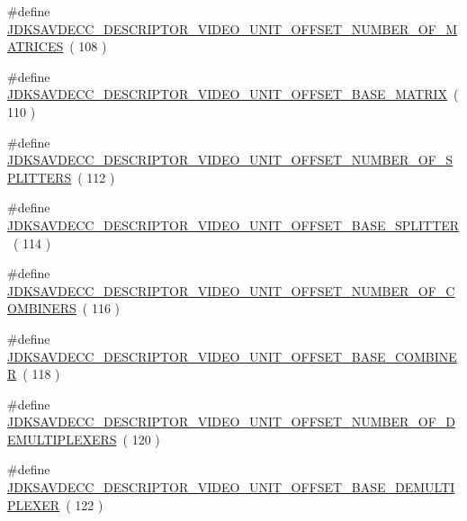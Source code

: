 \begin{DoxyCompactItemize}
\item 
\#define \hyperlink{group__descriptor__video_ga3549e1c7c5be1dfc1db84aa51083394e}{J\+D\+K\+S\+A\+V\+D\+E\+C\+C\+\_\+\+D\+E\+S\+C\+R\+I\+P\+T\+O\+R\+\_\+\+V\+I\+D\+E\+O\+\_\+\+U\+N\+I\+T\+\_\+\+O\+F\+F\+S\+E\+T\+\_\+\+N\+U\+M\+B\+E\+R\+\_\+\+O\+F\+\_\+\+M\+A\+T\+R\+I\+C\+ES}~( 108 )
\item 
\#define \hyperlink{group__descriptor__video_gae59c535b6c512447f82fccc29dc3398a}{J\+D\+K\+S\+A\+V\+D\+E\+C\+C\+\_\+\+D\+E\+S\+C\+R\+I\+P\+T\+O\+R\+\_\+\+V\+I\+D\+E\+O\+\_\+\+U\+N\+I\+T\+\_\+\+O\+F\+F\+S\+E\+T\+\_\+\+B\+A\+S\+E\+\_\+\+M\+A\+T\+R\+IX}~( 110 )
\item 
\#define \hyperlink{group__descriptor__video_ga698544839adab2fb1b10938c3c26995c}{J\+D\+K\+S\+A\+V\+D\+E\+C\+C\+\_\+\+D\+E\+S\+C\+R\+I\+P\+T\+O\+R\+\_\+\+V\+I\+D\+E\+O\+\_\+\+U\+N\+I\+T\+\_\+\+O\+F\+F\+S\+E\+T\+\_\+\+N\+U\+M\+B\+E\+R\+\_\+\+O\+F\+\_\+\+S\+P\+L\+I\+T\+T\+E\+RS}~( 112 )
\item 
\#define \hyperlink{group__descriptor__video_ga48799b11c2bab8868d33868c6d81d2aa}{J\+D\+K\+S\+A\+V\+D\+E\+C\+C\+\_\+\+D\+E\+S\+C\+R\+I\+P\+T\+O\+R\+\_\+\+V\+I\+D\+E\+O\+\_\+\+U\+N\+I\+T\+\_\+\+O\+F\+F\+S\+E\+T\+\_\+\+B\+A\+S\+E\+\_\+\+S\+P\+L\+I\+T\+T\+ER}~( 114 )
\item 
\#define \hyperlink{group__descriptor__video_ga561a9c62a244574276effb936ba4f046}{J\+D\+K\+S\+A\+V\+D\+E\+C\+C\+\_\+\+D\+E\+S\+C\+R\+I\+P\+T\+O\+R\+\_\+\+V\+I\+D\+E\+O\+\_\+\+U\+N\+I\+T\+\_\+\+O\+F\+F\+S\+E\+T\+\_\+\+N\+U\+M\+B\+E\+R\+\_\+\+O\+F\+\_\+\+C\+O\+M\+B\+I\+N\+E\+RS}~( 116 )
\item 
\#define \hyperlink{group__descriptor__video_ga13c3ef0d60bc8283d4092b202cd6f3dd}{J\+D\+K\+S\+A\+V\+D\+E\+C\+C\+\_\+\+D\+E\+S\+C\+R\+I\+P\+T\+O\+R\+\_\+\+V\+I\+D\+E\+O\+\_\+\+U\+N\+I\+T\+\_\+\+O\+F\+F\+S\+E\+T\+\_\+\+B\+A\+S\+E\+\_\+\+C\+O\+M\+B\+I\+N\+ER}~( 118 )
\item 
\#define \hyperlink{group__descriptor__video_ga5a77d96e32972b94e1f401ee2fd19cb2}{J\+D\+K\+S\+A\+V\+D\+E\+C\+C\+\_\+\+D\+E\+S\+C\+R\+I\+P\+T\+O\+R\+\_\+\+V\+I\+D\+E\+O\+\_\+\+U\+N\+I\+T\+\_\+\+O\+F\+F\+S\+E\+T\+\_\+\+N\+U\+M\+B\+E\+R\+\_\+\+O\+F\+\_\+\+D\+E\+M\+U\+L\+T\+I\+P\+L\+E\+X\+E\+RS}~( 120 )
\item 
\#define \hyperlink{group__descriptor__video_ga63e204bcaefd641eee6cf36872315780}{J\+D\+K\+S\+A\+V\+D\+E\+C\+C\+\_\+\+D\+E\+S\+C\+R\+I\+P\+T\+O\+R\+\_\+\+V\+I\+D\+E\+O\+\_\+\+U\+N\+I\+T\+\_\+\+O\+F\+F\+S\+E\+T\+\_\+\+B\+A\+S\+E\+\_\+\+D\+E\+M\+U\+L\+T\+I\+P\+L\+E\+X\+ER}~( 122 )
\item 

\end{DoxyCompactItemize}
